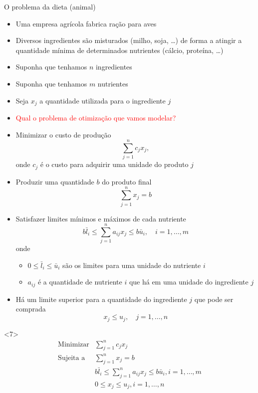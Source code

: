 \documentclass[10pt]{beamer}
\begin{document}
\begin{frame}{O problema da dieta (animal)}

  \begin{itemize}
  \item<only@1> Uma empresa agrícola fabrica ração para aves
  \item<only@1> Diversos ingredientes são misturados (milho, soja,
    \dots) de forma a atingir a quantidade mínima de determinados
    nutrientes (cálcio, proteína, \dots)

  \item<only@2> Suponha que tenhamos \alert{$n$ ingredientes}
  \item<only@2> Suponha que tenhamos \alert{$m$ nutrientes}
  \item<only@2> Seja $x_j$ a quantidade utilizada para o ingrediente
    $j$
  \item<only@2> \textcolor{red}{Qual o problema de otimização que
      vamos modelar?}

  \item<only@3> Minimizar o custo de produção
    \[
      \sum_{j = 1}^n c_j x_j,
    \]
    onde $c_j$ é o custo para adquirir \alert{uma unidade} do produto
    $j$
    
  \item<only@4> Produzir uma quantidade $b$ do produto final
    \[
      \sum_{j = 1}^n x_j = b
    \]
  \item<only@5> Satisfazer limites \alert{mínimos} e \alert{máximos}
    de cada nutriente
    \[
      b \bar l_i \le \sum_{j = 1}^n a_{ij} x_j \le b \bar u_i, \quad i =
      1, \dots, m
    \]
    onde
    \begin{itemize}
    \item $0 \le \bar l_i \le \bar u_i$ são os limites para \alert{uma
        unidade} do nutriente $i$
    \item $a_{ij}$ é a quantidade de nutriente $i$ que há \alert{em
        uma unidade} do ingrediente $j$
    \end{itemize}

  \item<only@6> Há um limite superior para a quantidade do ingrediente
    $j$ que pode ser comprada
    \[
      x_j \le u_j, \quad j = 1, \dots, n
    \]
  \end{itemize}

  \begin{onlyenv}<7>
    \[ 
      \begin{array}{ll}
        \mbox{Minimizar} & \displaystyle \sum_{j = 1}^n c_j x_j \\
        \mbox{Sujeita a} & \displaystyle \sum_{j = 1}^n x_j = b \\[0.4cm]
                         & \displaystyle b \bar l_i \le \sum_{j = 1}^n a_{ij} x_j \le b \bar u_i, i = 1, \dots, m \\[0.3cm]
                         & 0 \le x_j \le u_j, i = 1, \dots, n
      \end{array}
    \]
  \end{onlyenv}
  
\end{frame}
\end{document}
